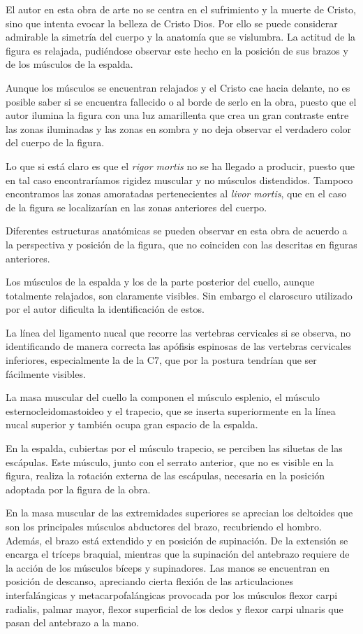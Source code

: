 El autor en esta obra de arte no se centra en el sufrimiento y la muerte de Cristo, sino que intenta evocar la belleza de Cristo Dios. Por ello se puede considerar admirable la simetría del cuerpo y la anatomía que se vislumbra. La actitud de la figura es relajada, pudiéndose observar este hecho en la posición de sus brazos y de los músculos de la espalda.

Aunque los músculos se encuentran relajados y el Cristo cae hacia delante, no es posible saber si se encuentra fallecido o al borde de serlo en la obra, puesto que el autor ilumina la figura con una luz amarillenta que crea un gran contraste entre las zonas iluminadas y las zonas en sombra y no deja observar el verdadero color del cuerpo de la figura.

Lo que si está claro es que el \textit{rigor mortis} no se ha llegado a producir, puesto que en tal caso encontraríamos rigidez muscular y no músculos distendidos. Tampoco encontramos las zonas amoratadas pertenecientes al \textit{livor mortis}, que en el caso de la figura se localizarían en las zonas anteriores del cuerpo.

Diferentes estructuras anatómicas se pueden observar en esta obra de acuerdo a la perspectiva y posición de la figura, que no coinciden con las descritas en figuras anteriores.

Los músculos de la espalda y los de la parte posterior del cuello, aunque totalmente relajados, son claramente visibles. Sin embargo el claroscuro utilizado por el autor dificulta la identificación de estos.

La línea del ligamento nucal que recorre las vertebras cervicales si se observa, no identificando de manera correcta las apófisis espinosas de las vertebras cervicales inferiores, especialmente la de la C7, que por la postura tendrían que ser fácilmente visibles. 

La masa muscular del cuello la componen el músculo esplenio, el músculo esternocleidomastoideo y el trapecio, que se inserta superiormente en la línea nucal superior y también ocupa gran espacio de la espalda.

En la espalda, cubiertas por el músculo trapecio, se perciben las siluetas de las escápulas. Este músculo, junto con  el serrato anterior, que no es visible en la figura, realiza la rotación externa de las escápulas, necesaria en la posición adoptada por la figura de la obra.

En la masa muscular de las extremidades superiores se aprecian los deltoides que son los principales músculos abductores del brazo, recubriendo el hombro. Además, el brazo está extendido y en posición de supinación. De la extensión se encarga el tríceps braquial, mientras que la supinación del antebrazo requiere de la acción de los músculos bíceps y supinadores. Las manos se encuentran en posición de descanso, apreciando cierta flexión de las articulaciones interfalángicas y metacarpofalángicas provocada por los músculos flexor carpi radialis, palmar mayor, flexor superficial de los dedos y flexor carpi ulnaris que pasan del antebrazo a la mano.

